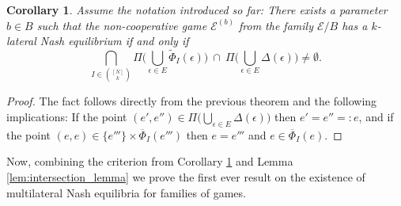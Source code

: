 \documentclass[a4paper,11pt,reqno,english]{amsart}
\theoremstyle{plain}
\newtheorem{corollary}[theorem]{Corollary}
\theoremstyle{definition}
\newcommand{\Ecal}{\mathcal{E}}
\begin{document}
\begin{corollary}\label{cor:criterion_021}
	Assume the notation introduced so far: There exists a parameter $b\in B$ such that the non-cooperative game $\Ecal^{(b)}$ from the family $\Ecal/B$ has a $k$-lateral Nash equilibrium if and only if
	\begin{displaymath}
		\bigcap_{I\in\binom{[N]}{k}}\Pi\big(\bigcup_{\epsilon\in E}\widetilde{\Phi}_I (\epsilon) \big) \ \cap \ \Pi\big(\bigcup_{\epsilon\in E} \Delta(\epsilon)\big)\neq \emptyset.
	\end{displaymath}
\end{corollary}
\begin{proof}
	The fact follows directly from the previous theorem and the following implications: If the point $(e',e'')\in \Pi\big(\bigcup_{\epsilon\in E} \Delta(\epsilon)\big)$ then $e'=e''=:e$, and if the point $(e,e)\in\{e'''\}\times \overline{\Phi}_I(e''')$ then $e=e'''$ and $e\in \overline{\Phi}_I(e)$.
\end{proof}


\medskip
Now, combining the criterion from Corollary  \ref{cor:criterion_021} and Lemma \ref{lem:intersection_lemma} we prove the first ever result on the existence of multilateral Nash equilibria for families of games.
\end{document}

